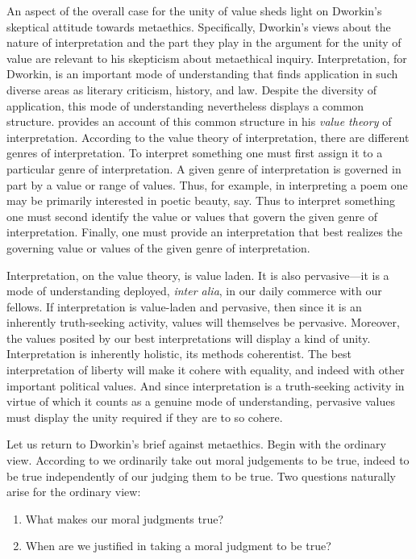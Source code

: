 \documentclass[12pt]{article}
\begin{document}
An aspect of the overall case for the unity of value sheds light on Dworkin's skeptical attitude towards metaethics. Specifically, Dworkin's views about the nature of interpretation and the part they play in the argument for the unity of value are relevant to his skepticism about metaethical inquiry. Interpretation, for Dworkin, is an important mode of understanding that finds application in such diverse areas as literary criticism, history, and law. Despite the diversity of application, this mode of understanding nevertheless displays a common structure. \citet[130--134]{Dworkin:2011fk} provides an account of this common structure in his \emph{value theory} of interpretation. According to the value theory of interpretation, there are different genres of interpretation. To interpret something one must first assign it to a particular genre of interpretation. A given genre of interpretation is governed in part by a value or range of values. Thus, for example, in interpreting a poem one may be primarily interested in poetic beauty, say. Thus to interpret something one must second identify the value or values that govern the given genre of interpretation. Finally, one must provide an interpretation that best realizes the governing value or values of the given genre of interpretation. 

Interpretation, on the value theory, is value laden. It is also pervasive---it is a mode of understanding deployed, \emph{inter alia}, in our daily commerce with our fellows. If interpretation is value-laden and pervasive, then since it is an inherently truth-seeking activity, values will themselves be pervasive. Moreover, the values posited by our best interpretations will display a kind of unity. Interpretation is inherently holistic, its methods coherentist. The best interpretation of liberty will make it cohere with equality, and indeed with other important political values. And since interpretation is a truth-seeking activity in virtue of which it counts as a genuine mode of understanding, pervasive values must display the unity required if they are to so cohere.

Let us return to Dworkin's brief against metaethics. Begin with the ordinary view. According to \citet[26-28]{Dworkin:2011fk} we ordinarily take out moral judgements to be true, indeed to be true independently of our judging them to be true. Two questions naturally arise for the ordinary view:
\begin{enumerate}
	\item What makes our moral judgments true?
	\item When are we justified in taking a moral judgment to be true?
\end{enumerate}
\end{document}
